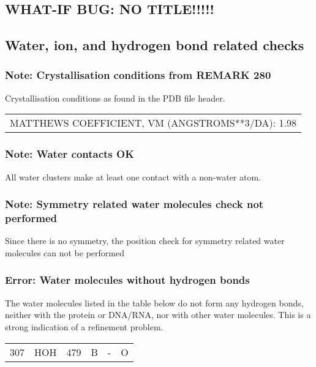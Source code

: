 \documentclass[a4paper]{article}
\def\showsect#1{
  \thesect\gdef\thesect{}
  \thessect\gdef\thessect{}
  \subsubsection{#1}
}
\def\ssect#1{
  \gdef\thessect{\subsection{#1}}
}
\gdef\thesect{\pagebreak[2]\section{WHAT-IF BUG: NO TITLE!!!!!}}
\gdef\thessect{\subsection{General}}
\begin{document}
\ssect{Water, ion, and hydrogen bond related checks}
\begin{note}
\showsect{Note: Crystallisation conditions from REMARK 280}
Crystallisation conditions as found in the PDB file header.
 
\begin{center}
 
\begin{supertabular}{l}
MATTHEWS COEFFICIENT, VM (ANGSTROMS**3/DA): 1.98\\
\end{supertabular}\end{center}
\end{note}

\begin{note}
\showsect{Note: Water contacts OK}
All water clusters make at least one contact with a non-water atom.
\end{note}

\begin{note}
\showsect{Note: Symmetry related water molecules check not performed}
Since there is no symmetry, the position check for symmetry related
water molecules can not be performed
\end{note}

\begin{error}
\showsect{Error: Water molecules without hydrogen bonds}
The water molecules listed in the table below do not form any hydrogen bonds,
neither with the protein or DNA/RNA, nor with other water molecules. This is
a strong indication of a refinement problem.
 
\begin{center}
 
\begin{supertabular}{rr@{ (}r@{) }rll}
  307&HOH & 479 &B &- &  O\\
\end{supertabular}\end{center}
\end{error}
\end{document}
